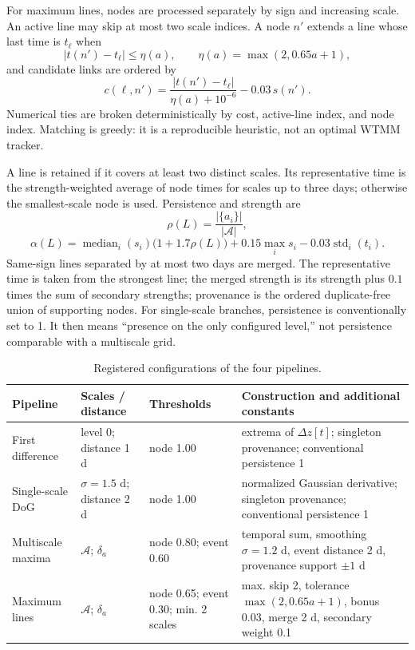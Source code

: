 For maximum lines, nodes are processed separately by sign and increasing scale. An active line may skip at most two scale indices. A node $n'$ extends a line whose last time is $t_\ell$ when
\begin{equation}
 |t(n')-t_\ell|\leq\eta(a),
 \qquad
 \eta(a)=\max(2,0.65a+1),
\end{equation}
and candidate links are ordered by
\begin{equation}
 c(\ell,n')=\frac{|t(n')-t_\ell|}{\eta(a)+10^{-6}}-0.03\,s(n').
\end{equation}
Numerical ties are broken deterministically by cost, active-line index, and node index. Matching is greedy: it is a reproducible heuristic, not an optimal WTMM tracker.

A line is retained if it covers at least two distinct scales. Its representative time is the strength-weighted average of node times for scales up to three days; otherwise the smallest-scale node is used. Persistence and strength are
\begin{equation}
 \rho(L)=\frac{|\{a_i\}|}{|\mathcal{A}|},
\end{equation}
\begin{equation}
 \alpha(L)=\operatorname{median}_i(s_i)\bigl(1+1.7\rho(L)\bigr)
 +0.15\max_i s_i-0.03\operatorname{std}_i(t_i).
\end{equation}
Same-sign lines separated by at most two days are merged. The representative time is taken from the strongest line; the merged strength is its strength plus $0.1$ times the sum of secondary strengths; provenance is the ordered duplicate-free union of supporting nodes. For single-scale branches, persistence is conventionally set to 1. It then means ``presence on the only configured level,'' not persistence comparable with a multiscale grid.

\begin{table}[H]
\centering
\caption{Registered configurations of the four pipelines.}
\label{tab:extractor-config}
\scriptsize
\begin{tabularx}{\textwidth}{@{}p{2.65cm}p{2.2cm}p{2.7cm}X@{}}
\toprule
Pipeline & Scales / distance & Thresholds & Construction and additional constants \\
\midrule
First difference & level 0; distance 1 d & node 1.00 & extrema of $\Delta z[t]$; singleton provenance; conventional persistence 1 \\
Single-scale DoG & $\sigma=1.5$ d; distance 2 d & node 1.00 & normalized Gaussian derivative; singleton provenance; conventional persistence 1 \\
Multiscale maxima & $\mathcal{A}$; $\delta_a$ & node 0.80; event 0.60 & temporal sum, smoothing $\sigma=1.2$ d, event distance 2 d, provenance support $\pm1$ d \\
Maximum lines & $\mathcal{A}$; $\delta_a$ & node 0.65; event 0.30; min. 2 scales & max. skip 2, tolerance $\max(2,0.65a+1)$, bonus 0.03, merge 2 d, secondary weight 0.1 \\
\bottomrule
\end{tabularx}
\end{table}


